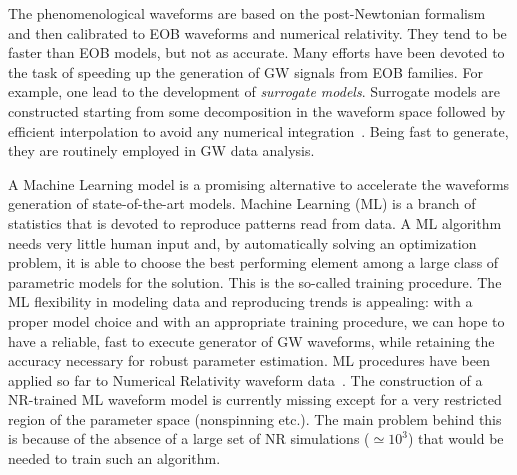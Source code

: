 The phenomenological waveforms are based on the post-Newtonian formalism and then calibrated 
to  EOB waveforms and numerical relativity. They tend to be faster than EOB models, but not as accurate.
Many efforts have been devoted to the task of speeding up the generation of GW signals from 
EOB families. For example, one lead to the development of \textit{surrogate models}. Surrogate 
models are constructed starting from some decomposition in the waveform space followed by efficient 
interpolation to avoid any  numerical integration~\cite{Purrer:2015tud,Bohe:2016gbl,Purrer:2017str,Lackey:2018zvw,Cotesta:2020qhw}. 
Being fast to generate, they are routinely employed in GW data analysis. 

A Machine Learning model is a promising alternative to accelerate the
waveforms generation of state-of-the-art models.
Machine Learning (ML) is a branch of statistics that is devoted to reproduce patterns read from data. 
A ML algorithm needs very little human input and, by automatically solving an optimization problem, 
it is able to choose the best performing element among a large  class of parametric models for the solution. 
This is the so-called training procedure. 
The ML flexibility in modeling data and reproducing trends is appealing: with a proper model choice 
and with an appropriate training procedure, we can hope to have a reliable, fast to execute generator 
of GW waveforms, while retaining the accuracy necessary for robust parameter estimation. 
ML procedures have been applied so far to Numerical Relativity 
waveform
data~\cite{Gabbard:2017lja,George:2017pmj,George:2017vlv,Rebei:2018lzh,Khan:2020foe}.
%
%
The construction of a NR-trained ML waveform model is currently missing except for a very 
restricted region of the parameter space (nonspinning etc.). The main problem behind this is 
because of the absence of a large set of NR simulations ($\simeq 10^{3}$) that would be 
needed to train such an algorithm.

